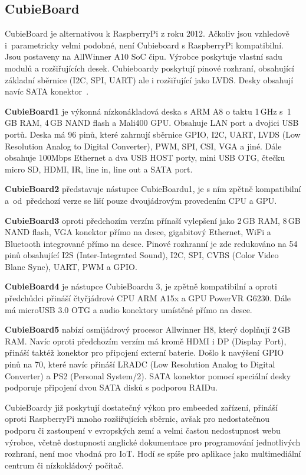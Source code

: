 	\subsection{CubieBoard}
	\label{KapCubie}
			CubieBoard je alternativou k RaspberryPi z roku 2012. Ačkoliv jsou vzhledově i~parametricky velmi podobné, není Cubieboard s RaspberryPi kompatibilní. Jsou postaveny na AllWinner A10 SoC čipu. Výrobce poskytuje vlastní sadu modulů a rozšiřujících desek. Cubieboardy poskytují pinové rozhraní, obsahující základní sběrnice (I2C, SPI, UART) ale i rozšiřující jako LVDS. Desky obsahují navíc SATA konektor~\cite{CubieBoards}.
	
	\textbf{CubieBoard1} je výkonná nízkonákladová deska s ARM A8 o taktu 1\,GHz s~1\,GB RAM, 4\,GB NAND flash a Mali400 GPU. Obsahuje LAN port a dvojici USB portů. Deska má 96 pinů, které zahrnují sběrnice GPIO, I2C, UART, LVDS (Low Resolution Analog to Digital Converter), PWM, SPI, CSI, VGA a jiné. Dále obsahuje 100Mbps Ethernet a dva USB HOST porty, mini USB OTG, čtečku micro SD, HDMI, IR, line in, line out a SATA port.
	
	\textbf{CubieBoard2} představuje nástupce CubieBoardu1, je s ním zpětně kompatibilní a~od~předchozí verze se liší pouze dvoujádrovým provedením CPU a GPU.
		
	\textbf{CubieBoard3} oproti předchozím verzím přínaší vylepšení jako 2\,GB RAM, 8\,GB NAND flash, VGA konektor přímo na desce, gigabitový Ethernet, WiFi a Bluetooth integrované přímo na desce. Pinové rozhranní je zde redukováno na 54 pinů obsahující I2S (Inter-Integrated Sound), I2C, SPI, CVBS (Color Video Blanc Sync), UART, PWM a GPIO.
	
		\textbf{CubieBoard4} je nástupce CubieBoardu 3, je zpětně kompatibilní a oproti předchůdci přináší čtyřjádrové CPU ARM A15x a GPU PowerVR G6230. Dále má microUSB 3.0 OTG a audio konektory umístěné přímo na desce.
		
			\textbf{CubieBoard5 }nabízí osmijádrový procesor Allwinner H8, který doplňují 2\,GB RAM. Navíc oproti předchozím verzím má kromě HDMI i DP (Display Port), přináší taktéž konektor pro připojení externí baterie. Došlo k navýšení GPIO pinů na 70, které navíc přináší LRADC (Low Resolution Analog to Digital Converter) a PS2 (Personal System/2). SATA konektor pomocí speciální desky podporuje připojení dvou SATA disků s podporou RAIDu.
		
CubieBoardy již poskytují dostatečný výkon pro embeeded zařízení, přináší oproti RaspberryPi mnoho rozšiřujících sběrnic, avšak pro nedostatečnou podporu či zastoupení v evropských zemí a velmi častou nedostupnost webu výrobce, včetně dostupnosti anglické dokumentace pro  programování jednotlivých rozhraní, není moc vhodná pro IoT. Hodí se spíše pro aplikace jako multimediální centrum či nízkokládový počítač. 	

